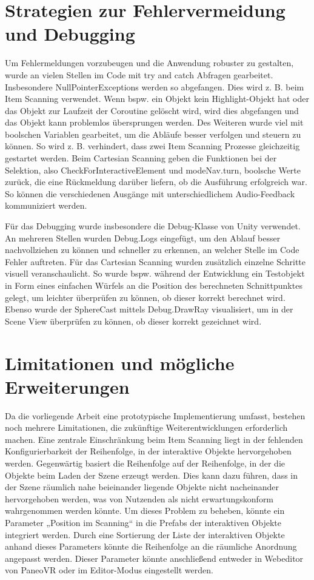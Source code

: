 \section{Strategien zur Fehlervermeidung und Debugging}

Um Fehlermeldungen vorzubeugen und die Anwendung robuster zu gestalten, wurde an vielen Stellen im Code mit try and catch Abfragen gearbeitet. Insbesondere NullPointerExceptions werden so abgefangen. Dies wird z. B. beim Item Scanning verwendet. Wenn bspw. ein Objekt kein Highlight-Objekt hat oder das Objekt zur Laufzeit der Coroutine gelöscht wird, wird dies abgefangen und das Objekt kann problemlos übersprungen werden. Des Weiteren wurde viel mit boolschen Variablen gearbeitet, um die Abläufe besser verfolgen und steuern zu können. So wird z. B. verhindert, dass zwei Item Scanning Prozesse gleichzeitig gestartet werden. Beim Cartesian Scanning geben die Funktionen bei der Selektion, also CheckForInteractiveElement und modeNav.turn, boolsche Werte zurück, die eine Rückmeldung darüber liefern, ob die Ausführung erfolgreich war. So können die verschiedenen Ausgänge mit unterschiedlichem Audio-Feedback kommuniziert werden. 

Für das Debugging wurde insbesondere die Debug-Klasse von Unity verwendet. An mehreren Stellen wurden Debug.Logs eingefügt, um den Ablauf besser nachvollziehen zu können und schneller zu erkennen, an welcher Stelle im Code Fehler auftreten. Für das Cartesian Scanning wurden zusätzlich einzelne Schritte visuell veranschaulicht. So wurde bspw. während der Entwicklung ein Testobjekt in Form eines einfachen Würfels an die Position des berechneten Schnittpunktes gelegt, um leichter überprüfen zu können, ob dieser korrekt berechnet wird. Ebenso wurde der SphereCast mittels Debug.DrawRay visualisiert, um in der Scene View überprüfen zu können, ob dieser korrekt gezeichnet wird.


\section{Limitationen und mögliche Erweiterungen}

Da die vorliegende Arbeit eine prototypische Implementierung umfasst, bestehen noch mehrere Limitationen, die zukünftige Weiterentwicklungen erforderlich machen.
Eine zentrale Einschränkung beim Item Scanning liegt in der fehlenden Konfigurierbarkeit der Reihenfolge, in der interaktive Objekte hervorgehoben werden. Gegenwärtig basiert die Reihenfolge auf der Reihenfolge, in der die Objekte beim Laden der Szene erzeugt werden. Dies kann dazu führen, dass in der Szene räumlich nahe beieinander liegende Objekte nicht nacheinander hervorgehoben werden, was von Nutzenden als nicht erwartungskonform wahrgenommen werden könnte. Um dieses Problem zu beheben, könnte ein Parameter „Position im Scanning“ in die Prefabs der interaktiven Objekte integriert werden. Durch eine Sortierung der Liste der interaktiven Objekte anhand dieses Parameters könnte die Reihenfolge an die räumliche Anordnung angepasst werden. Dieser Parameter könnte anschließend entweder in Webeditor von PaneoVR oder im Editor-Modus eingestellt werden. 

